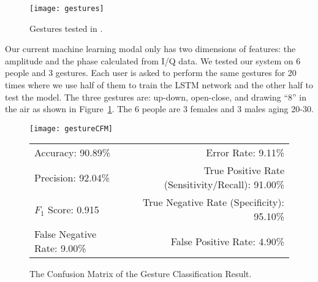 \begin{figure}[h]
	\centering
	\begin{minipage}{.6\linewidth}
		\texttt{[image: gestures]}
	\end{minipage}
	\caption{Gestures tested in {\uu}.}	
	\label{fig:gestures}
\end{figure}


Our current machine learning modal only has two dimensions of features: the amplitude and the phase calculated from I/Q data. We tested our {\uu} system on 6 people and 3 gestures. Each user is asked to perform the same gestures for 20 times where we use half of them to train the LSTM network and the other half to test the model. The three gestures are: up-down, open-close, and drawing ``8'' in the air as shown in Figure~\ref{fig:gestures}. The 6 people are 3 females and 3 males aging 20-30. 


\begin{figure}[!h]
	\centering
	\begin{minipage}{.38\linewidth}
		\texttt{[image: gestureCFM]}
		\vspace{.05in}
	\end{minipage}
	
	\centering
	\begin{tabular}{lr}
		\toprule
		Accuracy: 90.89\% & \hspace{-.55in} Error Rate: 9.11\% \\
		Precision: 92.04\% & \hspace{-.55in} True Positive Rate (Sensitivity/Recall): 91.00\% \\
		$F_1$ Score: 0.915 & \hspace{-.55in} True Negative Rate (Specificity): 95.10\% \\
		False Negative Rate: 9.00\% & \hspace{-.55in} False Positive Rate: 4.90\% \\
		\bottomrule
	\end{tabular}
	\caption{The Confusion Matrix of the Gesture Classification Result.
	}
	\label{fig:gestureCFM}
\end{figure}

